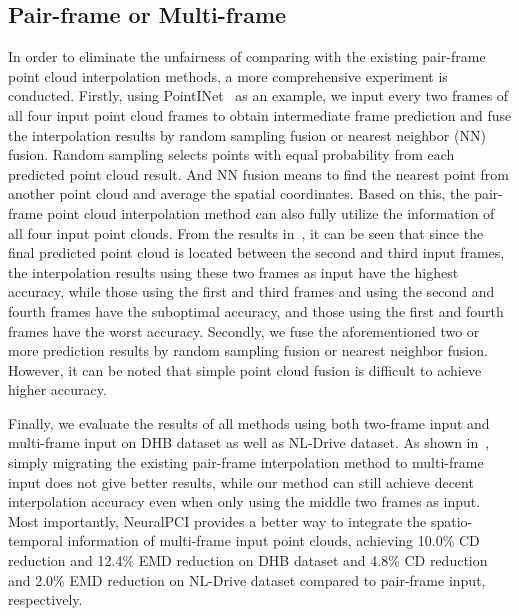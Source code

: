 \documentclass[10pt,twocolumn,letterpaper]{article}
\begin{document}
\subsection{Pair-frame or Multi-frame}

In order to eliminate the unfairness of comparing with the existing pair-frame point cloud interpolation methods, a more comprehensive experiment is conducted. Firstly, using PointINet~\cite{lu2021pointinet} as an example, we input every two frames of all four input point cloud frames to obtain intermediate frame prediction and fuse the interpolation results by random sampling fusion or nearest neighbor (NN) fusion. Random sampling selects points with equal probability from each predicted point cloud result. And NN fusion means to find the nearest point from another point cloud and average the spatial coordinates. Based on this, the pair-frame point cloud interpolation method can also fully utilize the information of all four input point clouds. From the results in~, it can be seen that since the final predicted point cloud is located between the second and third input frames, the interpolation results using these two frames as input have the highest accuracy, while those using the first and third frames and using the second and fourth frames have the suboptimal accuracy, and those using the first and fourth frames have the worst accuracy. Secondly, we fuse the aforementioned two or more prediction results by random sampling fusion or nearest neighbor fusion. However, it can be noted that simple point cloud fusion is difficult to achieve higher accuracy.

Finally, we evaluate the results of all methods using both two-frame input and multi-frame input on DHB dataset as well as NL-Drive dataset. As shown in~, simply migrating the existing pair-frame interpolation method to multi-frame input does not give better results, while our method can still achieve decent interpolation accuracy even when only using the middle two frames as input. Most importantly, NeuralPCI provides a better way to integrate the spatio-temporal information of multi-frame input point clouds, achieving 10.0\% CD reduction and 12.4\% EMD reduction on DHB dataset and 4.8\% CD reduction and 2.0\% EMD reduction on NL-Drive dataset compared to pair-frame input, respectively.
\end{document}
